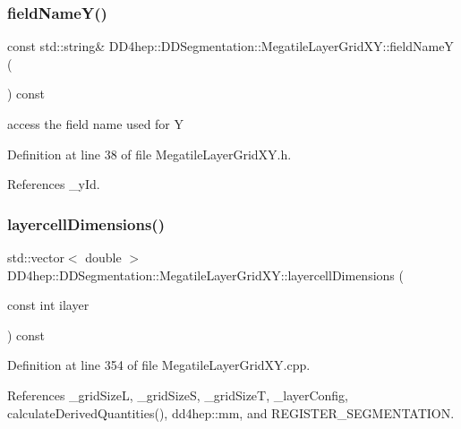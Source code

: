 \subsubsection{\texorpdfstring{field\+Name\+Y()}{fieldNameY()}}
{\footnotesize\ttfamily const std\+::string\& D\+D4hep\+::\+D\+D\+Segmentation\+::\+Megatile\+Layer\+Grid\+X\+Y\+::field\+NameY (\begin{DoxyParamCaption}{ }\end{DoxyParamCaption}) const\hspace{0.3cm}{\ttfamily [inline]}}



access the field name used for Y 



Definition at line 38 of file Megatile\+Layer\+Grid\+X\+Y.\+h.



References \+\_\+y\+Id.

\hypertarget{class_d_d4hep_1_1_d_d_segmentation_1_1_megatile_layer_grid_x_y_a4796d3c86d0db3ab905ec062fb24a654}{}\label{class_d_d4hep_1_1_d_d_segmentation_1_1_megatile_layer_grid_x_y_a4796d3c86d0db3ab905ec062fb24a654} 
\subsubsection{\texorpdfstring{layercell\+Dimensions()}{layercellDimensions()}}
{\footnotesize\ttfamily std\+::vector$<$ double $>$ D\+D4hep\+::\+D\+D\+Segmentation\+::\+Megatile\+Layer\+Grid\+X\+Y\+::layercell\+Dimensions (\begin{DoxyParamCaption}\item[{const int}]{ilayer }\end{DoxyParamCaption}) const\hspace{0.3cm}{\ttfamily [virtual]}}



Definition at line 354 of file Megatile\+Layer\+Grid\+X\+Y.\+cpp.



References \+\_\+grid\+SizeL, \+\_\+grid\+SizeS, \+\_\+grid\+SizeT, \+\_\+layer\+Config, calculate\+Derived\+Quantities(), dd4hep\+::mm, and R\+E\+G\+I\+S\+T\+E\+R\+\_\+\+S\+E\+G\+M\+E\+N\+T\+A\+T\+I\+ON.



